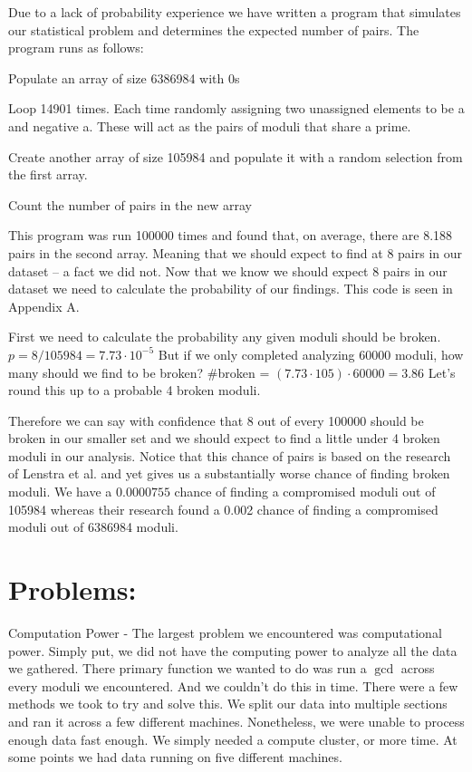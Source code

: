 \documentclass[11pt,twoside]{article}
\begin{document}
\begin{multicols}{2}
Due to a lack of probability experience we have written a program that simulates
our statistical problem and determines the expected number of pairs. The program
runs as follows:
\begin{compactitem}
\item Populate an array of size 6386984 with 0s
\item Loop 14901 times. Each time randomly assigning two unassigned elements to
be a and negative a. These will act as the pairs of moduli that share a prime.
\item Create another array of size 105984 and populate it with a random 
selection from the first array.
\item Count the number of pairs in the new array
\end{compactitem}
This program was run 100000 times and found that, on average, there are 8.188
pairs in the second array. Meaning that we should expect to find at 8 pairs in
our dataset – a fact we did not. Now that we know we should expect 8 pairs in 
our dataset we need to calculate the probability of our findings. This code is
seen in Appendix A.

First we need to calculate the probability any given moduli should be broken. 
$p = 8/105984= 7.73\cdot10^{-5}$
But if we only completed analyzing 60000 moduli, how many should we find to be 
broken? \#broken = $(7.73\cdot105)\cdot60000 = 3.86$ Let's round this up to a 
probable 4 broken moduli. 

Therefore we can say with confidence that 8 out of every 100000 should be
broken in our smaller set and we should expect to find a little under 4 broken
moduli in our analysis. Notice that this chance of pairs is based on the
research of Lenstra et al. and yet gives us a substantially worse chance of
finding broken moduli. We have a $0.0000755$ chance of finding a compromised
moduli out of 105984 whereas their research found a 0.002 chance of finding a
compromised moduli out of 6386984 moduli.

\section{Problems:}

Computation Power - The largest problem we encountered was computational power.
Simply put, we did not have the computing power to analyze all the data we
gathered. There primary function we wanted to do was run a $\gcd$ across
every moduli we encountered. And we couldn't do this in time. There were a few
methods we took to try and solve this. We split our data into multiple sections
and ran it across a few different machines. Nonetheless, we were unable to
process enough data fast enough. We simply needed a compute cluster, or more
time. At some points we had data running on five different machines.


\end{multicols}
\end{document}
